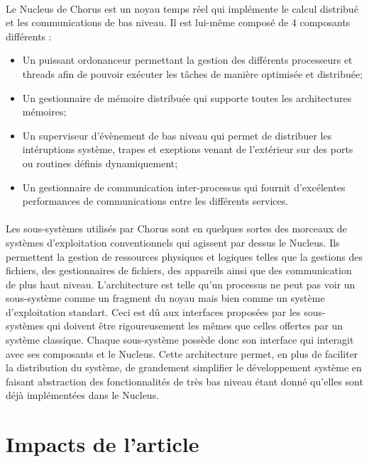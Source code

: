 \documentclass[a4paper, 12pt]{article}
\begin{document}
\paragraph{}
Le Nucleus de Chorus est un noyau temps réel qui implémente le calcul distribué et les communications de bas niveau. Il est lui-même composé de 4 composants différents :
\begin{itemize}
	\item Un puissant ordonanceur permettant la gestion des différents processeurs et threads afin de pouvoir exécuter les tâches de manière optimisée et distribuée;
	\item Un gestionnaire de mémoire distribuée qui supporte toutes les architectures mémoires;
	\item Un superviseur d'évènement de bas niveau qui permet de distribuer les intéruptions système, trapes et exeptions venant de l'extérieur sur des ports ou routines définis dynamiquement;
	\item Un gestionnaire de communication inter-processus qui fournit d'excélentes performances de communications entre les différents services.
\end{itemize}

\paragraph{}
Les sous-systèmes utilisés par Chorus sont en quelques sortes des morceaux de systèmes d'exploitation conventionnels qui agissent par dessus le Nucleus. Ils permettent la gestion de ressources physiques et logiques telles que la gestions des fichiers, des gestionnaires de fichiers, des appareils ainsi que des communication de plus haut niveau. L'architecture est telle qu'un processus ne peut pas voir un sous-système comme un fragment du noyau mais bien comme un système d'exploitation standart. Ceci est dû aux interfaces proposées par les sous-systèmes qui doivent être rigoureusement les mêmes que celles offertes par un système classique. Chaque sous-système possède donc son interface qui interagit avec ses composants et le Nucleus. Cette architecture permet, en plus de faciliter la distribution du système, de grandement simplifier le développement système en faisant abstraction des fonctionnalités de très bas niveau étant donné qu'elles sont déjà implémentées dans le Nucleus.

\clearpage 
\section{Impacts de l'article}
\end{document}
